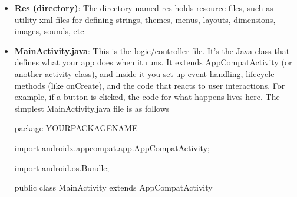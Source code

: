 \documentclass{report}
\begin{document}
\begin{itemize}
        \item \textbf{Res (directory)}: The directory named res holds resource files, such as utility xml files for defining strings, themes, menus, layouts, dimensions, images, sounds, etc
        \item \textbf{MainActivity.java}: This is the logic/controller file. It's the Java class that defines what your app does when it runs. It extends AppCompatActivity (or another activity class), and inside it you set up event handling, lifecycle methods (like onCreate), and the code that reacts to user interactions. For example, if a button is clicked, the code for what happens lives here.
            \bigbreak \noindent 
            The simplest MainActivity.java file is as follows
            \bigbreak \noindent 
            \begin{javacode}
                package YOURPACKAGENAME

                import androidx.appcompat.app.AppCompatActivity;

                import android.os.Bundle;

                public class MainActivity extends AppCompatActivity {

}
\end{javacode}
\end{itemize}
\end{document}
